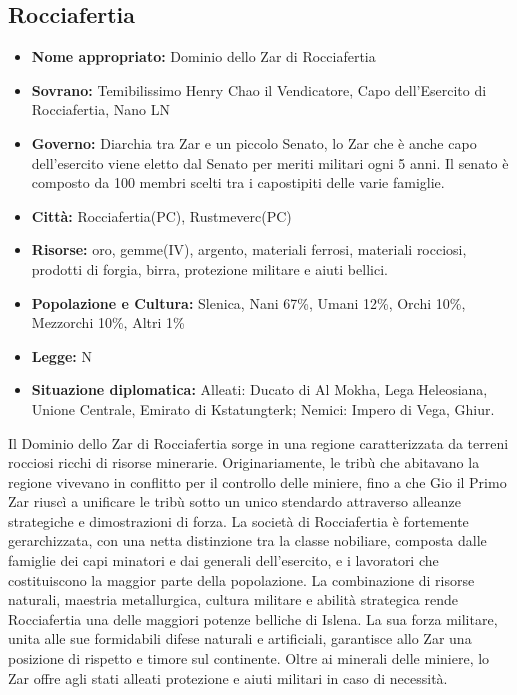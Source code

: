 \documentclass[10pt, a4paper]{report}
\begin{document}
\begin{multicols}{2}
\subsection*{Rocciafertia}
\begin{itemize}
	\item \textbf{Nome appropriato:} Dominio dello Zar di Rocciafertia
	\item \textbf{Sovrano:} Temibilissimo Henry Chao il Vendicatore, Capo dell'Esercito di Rocciafertia, Nano LN
	\item \textbf{Governo:} Diarchia tra Zar e un piccolo Senato, lo Zar che è anche capo dell'esercito viene eletto dal Senato per meriti militari ogni 5 anni. Il senato è composto da 100 membri scelti tra i capostipiti delle varie famiglie.
	\item \textbf{Città:} Rocciafertia(PC), Rustmeverc(PC)
	\item \textbf{Risorse:} oro, gemme(IV), argento, materiali ferrosi, materiali rocciosi, prodotti di forgia, birra, protezione militare e aiuti bellici.
	\item \textbf{Popolazione e Cultura:} Slenica, Nani 67\%, Umani 12\%, Orchi 10\%, Mezzorchi 10\%, Altri 1\%
	\item \textbf{Legge:} N
	\item \textbf{Situazione diplomatica:} Alleati: Ducato di Al Mokha, Lega Heleosiana, Unione Centrale, Emirato di Kstatungterk; Nemici: Impero di Vega, Ghiur.
\end{itemize}
Il Dominio dello Zar di Rocciafertia sorge in una regione caratterizzata da terreni rocciosi ricchi di risorse minerarie. Originariamente, le tribù che abitavano la regione vivevano in conflitto per il controllo delle miniere, fino a che Gio il Primo Zar riuscì a unificare le tribù sotto un unico stendardo attraverso alleanze strategiche e dimostrazioni di forza. 
La società di Rocciafertia è fortemente gerarchizzata, con una netta distinzione tra la classe nobiliare, composta dalle famiglie dei capi minatori e dai generali dell'esercito, e i lavoratori che costituiscono la maggior parte della popolazione. La combinazione di risorse naturali, maestria metallurgica, cultura militare e abilità strategica rende Rocciafertia una delle maggiori potenze belliche di Islena. La sua forza militare, unita alle sue formidabili difese naturali e artificiali, garantisce allo Zar una posizione di rispetto e timore sul continente. Oltre ai minerali delle miniere, lo Zar offre agli stati alleati protezione e aiuti militari in caso di necessità.


\end{multicols}
\end{document}
